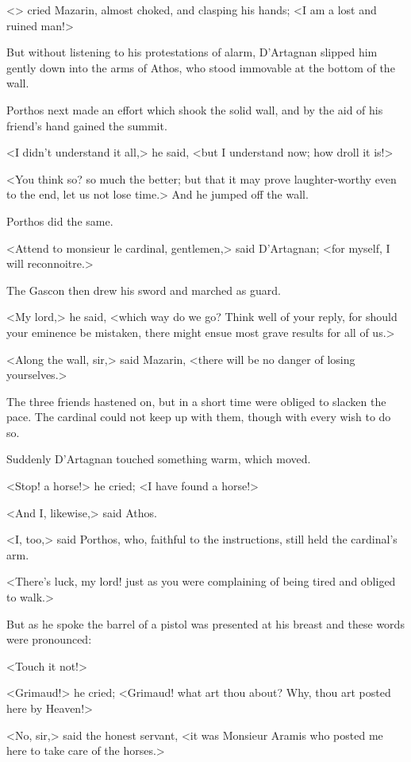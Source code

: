 <> cried Mazarin, almost choked, and clasping his hands; <I am a lost and ruined man!>

But without listening to his protestations of alarm, D'Artagnan slipped him gently down into the arms of Athos, who stood immovable at the bottom of the wall.

Porthos next made an effort which shook the solid wall, and by the aid of his friend's hand gained the summit.

<I didn't understand it all,> he said, <but I understand now; how droll it is!>

<You think so? so much the better; but that it may prove laughter-worthy even to the end, let us not lose time.> And he jumped off the wall.

Porthos did the same.

<Attend to monsieur le cardinal, gentlemen,> said D'Artagnan; <for myself, I will reconnoitre.>

The Gascon then drew his sword and marched as  guard.

<My lord,> he said, <which way do we go? Think well of your reply, for should your eminence be mistaken, there might ensue most grave results for all of us.>

<Along the wall, sir,> said Mazarin, <there will be no danger of losing yourselves.>

The three friends hastened on, but in a short time were obliged to slacken the pace. The cardinal could not keep up with them, though with every wish to do so.

Suddenly D'Artagnan touched something warm, which moved.

<Stop! a horse!> he cried; <I have found a horse!>

<And I, likewise,> said Athos.

<I, too,> said Porthos, who, faithful to the instructions, still held the cardinal's arm.

<There's luck, my lord! just as you were complaining of being tired and obliged to walk.>

But as he spoke the barrel of a pistol was presented at his breast and these words were pronounced:

<Touch it not!>

<Grimaud!> he cried; <Grimaud! what art thou about? Why, thou art posted here by Heaven!>

<No, sir,> said the honest servant, <it was Monsieur Aramis who posted me here to take care of the horses.>

